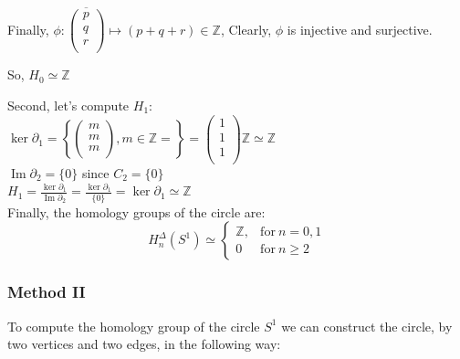 \documentclass[11pt,a4paper]{report}
\DeclareMathOperator{\Ima}{Im}
\begin{document}
           Finally, $ \phi: \overline{\left(\begin{array}{c}
                    p\\
                    q\\
                    r\\
            \end{array} \right)} \mapsto (p+q+r) \in \mathbb{Z} $, Clearly, $\phi$ is injective and surjective.

          So, $H_0 \simeq \mathbb{Z} $ \\

\par
Second, let's compute $H_1$: \\
$\ker\partial_1 = \left\{ \left(\begin{array}{c}
                    m\\
                    m\\
                    m\\
            \end{array} \right), m \in \mathbb{Z} = \right\} = \left(\begin{array}{c}
                    1\\
                    1\\
                    1\\
            \end{array} \right) \mathbb{Z} \simeq \mathbb{Z}$ \\
$\Ima\partial_2 = \{0\}$ since $C_2 = \{0\}$ \\
$H_1 = \frac{\ker\partial_1}{\Ima\partial_2} =
		\frac{ \ker{\partial_1} }{ \{0\} } = \ker{\partial_1} \simeq \mathbb{Z}$ \\


Finally, the homology groups of the circle are:
		\[
	  		H_n^\Delta(S^1) \simeq \left\{
			      \begin{array}{rl}
			     \mathbb{Z}, & \textrm{for} \: n = 0, 1\\

                        0 & \textrm{for} \: n \geqslant 2
			      \end{array}
			 \right.
	  	\]

 \subsubsection{Method II}
                  To compute the homology group of the circle $S^1$ we can construct the circle, by two vertices and two edges, in the following way: \\
\end{document}
